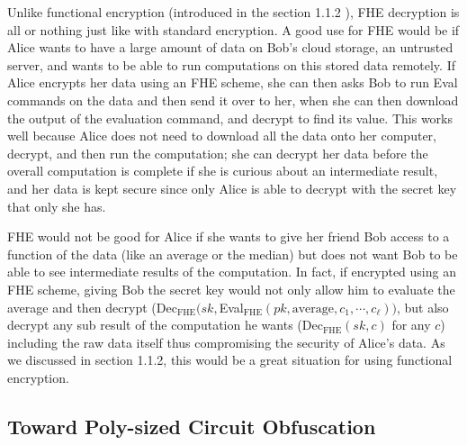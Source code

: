 \documentclass[12pt,twoside]{reedthesis}
\begin{document}
    \par Unlike functional encryption (introduced in the section 1.1.2 ), FHE decryption is all or nothing just like with standard encryption. A good use for FHE would be if Alice wants to have a large amount of data on Bob's cloud storage, an untrusted server, and wants to be able to run computations on this stored data remotely. If Alice encrypts her data using an FHE scheme, she can then asks Bob to run Eval commands on the data and then send it over to her, when she can then download the output of the evaluation command, and decrypt to find its value. This works well because Alice does not need to download all the data onto her computer, decrypt, and then run the computation; she can decrypt her data before the overall computation is complete if she is curious about an intermediate result, and her data is kept secure since only Alice is able to decrypt with the secret key that only she has.
    \par FHE would not be good for Alice if she wants to give her friend Bob access to a function of the data (like an average or the median) but does not want Bob to be able to see intermediate results of the computation. In fact, if encrypted using an FHE scheme, giving Bob the secret key would not only allow him to evaluate the average and then decrypt (Dec$_\text{FHE}(sk,$Eval$_\text{FHE}(pk,\text{average},c_1,\cdots,c_\ell))$, but also decrypt any sub result of the computation he wants (Dec$_\text{FHE}(sk,c)$ for any $c$) including the raw data itself thus compromising the security of Alice's data. As we discussed in section 1.1.2, this would be a great situation for using functional encryption.
    
    
    \subsection{Toward Poly-sized Circuit Obfuscation}
    
    \newcommand{\ionc}[0]{i\mathcal{O}_\text{NC}}
     \newcommand{\fhe}[0]{_\text{FHE}}
\end{document}
